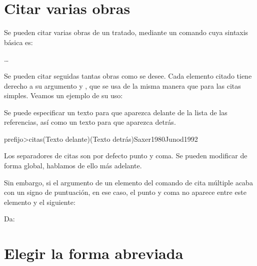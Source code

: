 \section{Citar varias obras}\label{citemultiple}

Se pueden citar varias obras de un tratado, mediante un comando cuya
sintaxis básica es:

…

Se pueden citar seguidas tantas obras como se desee. Cada elemento
citado tiene derecho a su argumento  y ,
que se usa de la misma manera que para las citas simples. Veamos un
ejemplo de su uso:

\begin{latexcode}
\autocites{Saxer1980}{Junod1992}
\end{latexcode}

\begin{quotation}
\cites{Saxer1980}{Junod1992}
\end{quotation}

Se puede especificar un texto para que aparezca delante de la lista de
las referencias, así como un texto para que aparezca detrás.

\begin{latexcode}
\<prefijo>citas(Texto delante)(Texto detrás){Saxer1980}{Junod1992}
\end{latexcode}

Los separadores de citas son por defecto punto y coma. Se pueden
modificar de forma global, hablamos de ello más adelante.

Sin embargo, si el argumento  de un elemento del comando
de cita múltiple acaba con un signo de puntuación, en ese caso, el
punto y coma no aparece entre este elemento y el siguiente:

\begin{latexcode}
\autocites[consúltese también:]{Saxer1980}{Urner1952}
\end{latexcode}

Da:

\begin{quotation}
\cites[consúltese también:]{Saxer1980}{Urner1952}
\end{quotation}


\section{Elegir la forma abreviada}\label{shortfields}

